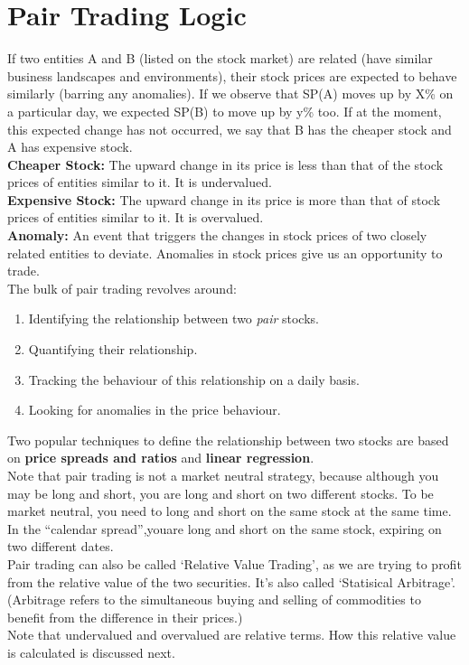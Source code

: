 \documentclass{article}
\begin{document}
\section{Pair Trading Logic}
If two entities A and B (listed on the stock market) are related (have similar business landscapes and environments), their stock prices are expected to behave similarly (barring any anomalies). If we observe that SP(A) moves up by X\% on a particular day, we expected SP(B) to move up by y\% too. If at the moment, this expected change has not occurred, we say that B has the cheaper stock and A has expensive stock.\\
\textbf{Cheaper Stock:} The upward change in its price is less than that of the stock prices of entities similar to it. It is undervalued.\\
\textbf{Expensive Stock:} The upward change in its price is more than that of stock prices of entities similar to it. It is overvalued.\\
\textbf{Anomaly: }An event that triggers the changes in stock prices of two closely related entities to deviate. Anomalies in stock prices give us an opportunity to trade.\\
The bulk of pair trading revolves around:
\begin{enumerate}
    \item Identifying the relationship between two \emph{pair} stocks.
    \item Quantifying their relationship.
    \item Tracking the behaviour of this relationship on a daily basis.
    \item Looking for anomalies in the price behaviour.
\end{enumerate}
Two popular techniques to define the relationship between two stocks are based on
\textbf{price spreads and ratios} and \textbf{linear regression}.\\
Note that pair trading is not a market neutral strategy, because although you may
be long and short, you are long and short on two different stocks. To be market 
neutral, you need to long and short on the same stock at the same time.
In the ``calendar spread'',youare long and short on the same stock, expiring on
two different dates.\\
Pair trading can also be called `Relative Value Trading', as we are trying
to profit from the relative value of the two securities. It's also called 
`Statisical Arbitrage'. (Arbitrage refers to the simultaneous buying and selling
of commodities to benefit from the difference in their prices.)\\
Note that undervalued and overvalued are relative terms. How this
relative value is calculated is discussed next.
\end{document}
